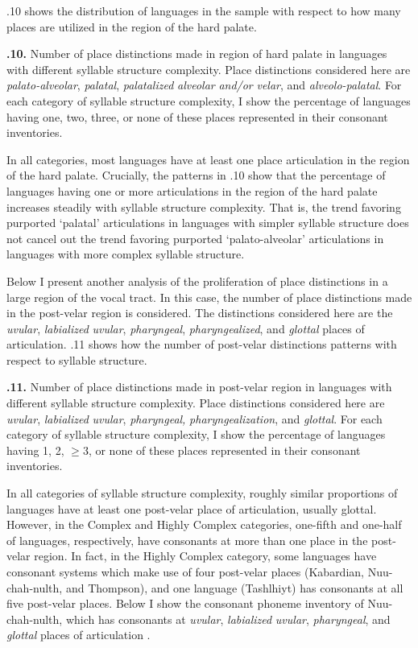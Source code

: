   .10 shows the distribution of languages in the sample with respect to how many places are utilized in the region of the hard palate.

\textbf{.10.} Number of place distinctions made in region of hard palate in languages with different syllable structure complexity. Place distinctions considered here are \textit{palato-alveolar}, \textit{palatal}, \textit{palatalized} \textit{alveolar} \textit{and/or} \textit{velar}, and \textit{alveolo-palatal}. For each category of syllable structure complexity, I show the percentage of languages having one, two, three, or none of these places represented in their consonant inventories.

  In all categories, most languages have at least one place articulation in the region of the hard palate. Crucially, the patterns in .10 show that the percentage of languages having one or more articulations in the region of the hard palate increases steadily with syllable structure complexity. That is, the trend favoring purported ‘palatal’ articulations in languages with simpler syllable structure does not cancel out the trend favoring purported ‘palato-alveolar’ articulations in languages with more complex syllable structure.

  Below I present another analysis of the proliferation of place distinctions in a large region of the vocal tract. In this case, the number of place distinctions made in the post-velar region is considered. The distinctions considered here are the \textit{uvular}, \textit{labialized} \textit{uvular}, \textit{pharyngeal}, \textit{pharyngealized}, and \textit{glottal} places of articulation. .11 shows how the number of post-velar distinctions patterns with respect to syllable structure.

\textbf{.11.} Number of place distinctions made in post-velar region in languages with different syllable structure complexity. Place distinctions considered here are \textit{uvular}, \textit{labialized} \textit{uvular}, \textit{pharyngeal,} \textit{pharyngealization}, and \textit{glottal}. For each category of syllable structure complexity, I show the percentage of languages having 1, 2, ${\geq}$3, or none of these places represented in their consonant inventories.

  In all categories of syllable structure complexity, roughly similar proportions of languages have at least one post-velar place of articulation, usually glottal. However, in the Complex and Highly Complex categories, one-fifth and one-half of languages, respectively, have consonants at more than one place in the post-velar region. In fact, in the Highly Complex category, some languages have consonant systems which make use of four post-velar places (Kabardian, Nuu-chah-nulth, and Thompson), and one language (Tashlhiyt) has consonants at all five post-velar places. Below I show the consonant phoneme inventory of Nuu-chah-nulth, which has consonants at \textit{uvular}, \textit{labialized} \textit{uvular}, \textit{pharyngeal}, and \textit{glottal} places of articulation .

